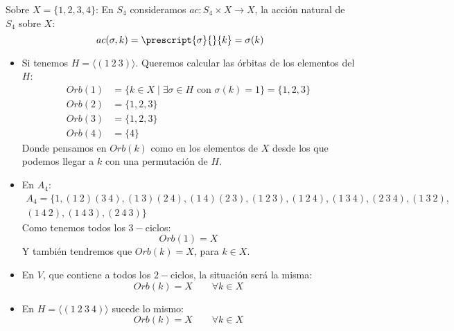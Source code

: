 \begin{ejemplo}
    Sobre $X = \{1,2,3,4\}$:
    En $S_4$ consideramos $ac:S_4\times X\to X$, la acción natural de $S_4$ sobre $X$:
        \begin{equation*}
            ac(\sigma,k) = \prescript{\sigma}{}{k} = \sigma(k)
        \end{equation*}
    \begin{itemize}
        \item Si tenemos $H = \langle (1\ 2\ 3) \rangle $. Queremos calcular las órbitas de los elementos del $H$:
            \begin{align*}
                Orb(1) &= \{k\in X \mid \exists \sigma\in H \text{\ con\ } \sigma(k) = 1\} = \{1,2,3\} \\
                Orb(2) &= \{1, 2, 3\} \\
                Orb(3) &= \{1, 2, 3\} \\
                Orb(4) &= \{4\}
            \end{align*}
            Donde pensamos en $Orb(k)$ como en los elementos de $X$ desde los que podemos llegar a $k$ con una permutación de $H$.
        \item En $A_4$:
            \begin{multline*}
                A_4 = \{1, (1\ 2)(3\ 4), (1\ 3)(2\ 4), (1\ 4)(2\ 3), (1\ 2\ 3), (1\ 2\ 4), (1\ 3\ 4), (2\ 3\ 4), (1\ 3\ 2),\\ (1\ 4\ 2), (1\ 4\ 3), (2\ 4\ 3)\}
            \end{multline*}
            Como tenemos todos los $3-$ciclos:
            \begin{equation*}
                Orb(1) = X
            \end{equation*}
            Y también tendremos que $Orb(k) = X$, para $k\in X$.
        \item En $V$, que contiene a todos los $2-$ciclos, la situación será la misma:
            \begin{equation*}
                Orb(k) = X \qquad \forall k\in X
            \end{equation*}
        \item En $H = \langle (1\ 2\ 3\ 4) \rangle $ sucede lo mismo:
            \begin{equation*}
                Orb(k) = X \qquad \forall k\in X
            \end{equation*}
    \end{itemize}
\end{ejemplo}


